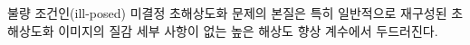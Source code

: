 \documentclass[10pt,twocolumn,letterpaper]{article}
\newcommand{\kor}[1]{#1}
\newcommand{\eng}[1]{}
\begin{document}
\eng{
The ill-posed nature of the underdetermined \ac{SR} problem is particularly pronounced for high upscaling factors, for which texture detail in the reconstructed \ac{SR} images is typically absent.
}\kor{
불량 조건인(ill-posed) 미결정 \ac{초해상도화} 문제의 본질은 특히 일반적으로 재구성된 \ac{초해상도화} 이미지의 질감 세부 사항이 없는 높은 해상도 향상 계수에서 두드러진다.
}
%
%
\end{document}
